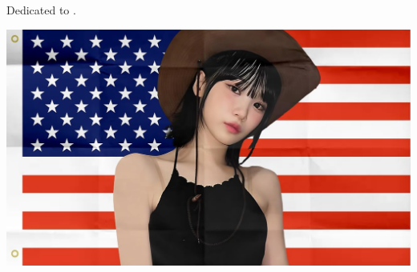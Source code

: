\newpage

\vspace*{\fill}

\begin{center}
    Dedicated to .

    \vspace{1em}

    \includegraphics[width=\textwidth]{1-frontmatter/assets/chaewon.jpg}
\end{center}

\vspace*{\fill}
